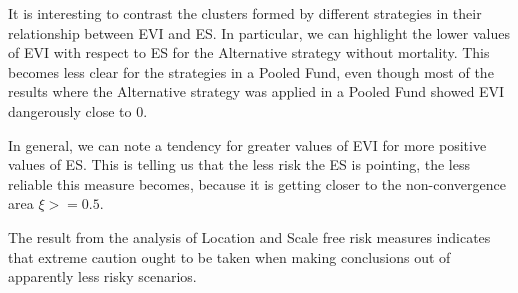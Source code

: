It is interesting to contrast the clusters formed by different strategies in their relationship between EVI and ES. In particular, we can highlight the lower values of EVI with respect to ES for the Alternative strategy without mortality. This becomes less clear for the strategies in a Pooled Fund, even though most of the results where the Alternative strategy was applied in a Pooled Fund showed EVI dangerously close to $0$.

In general, we can note a tendency for greater values of EVI for more positive values of ES. This is telling us that the less risk the ES is pointing, the less reliable this measure becomes, because it is getting closer to the non-convergence area $\xi >= 0.5$.

The result from the analysis of Location and Scale free risk measures indicates that extreme caution ought to be taken when making conclusions out of apparently less risky scenarios.







